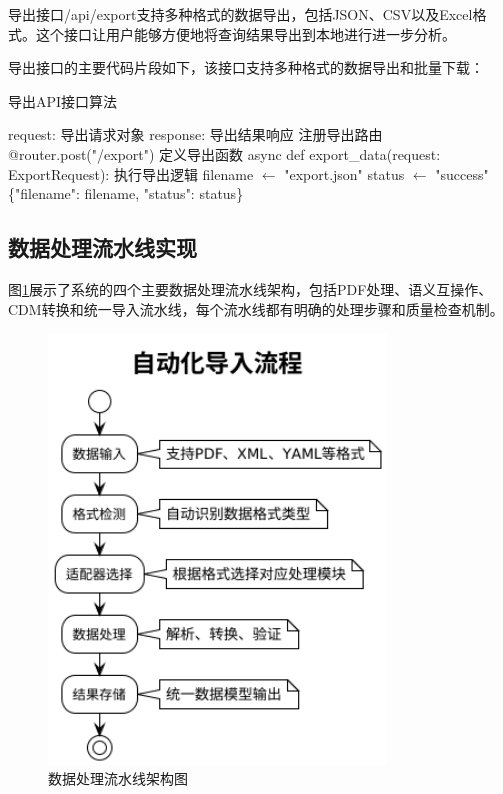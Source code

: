 导出接口/api/export支持多种格式的数据导出，包括JSON、CSV以及Excel格式。这个接口让用户能够方便地将查询结果导出到本地进行进一步分析。

导出接口的主要代码片段如下，该接口支持多种格式的数据导出和批量下载：

\begin{algorithm}[H]
\caption{导出API接口算法}
\begin{algorithmic}[1]
\REQUIRE request: 导出请求对象
\ENSURE response: 导出结果响应
\STATE 注册导出路由
\STATE @router.post("/export")
\STATE 定义导出函数
\STATE async def export\_data(request: ExportRequest):
\STATE     执行导出逻辑
\STATE     filename $\leftarrow$ "export.json"
\STATE     status $\leftarrow$ "success"
\STATE     \RETURN \{"filename": filename, "status": status\}
\end{algorithmic}
\end{algorithm}

\subsection{数据处理流水线实现}

图\ref{fig_data_processing_pipeline}展示了系统的四个主要数据处理流水线架构，包括PDF处理、语义互操作、CDM转换和统一导入流水线，每个流水线都有明确的处理步骤和质量检查机制。

\begin{figure}[H]
    \centering
    \includegraphics[width=0.8\textwidth,height=0.5\textheight,keepaspectratio]{chapters/fig-0/data_processing_pipeline.png}
    \caption{数据处理流水线架构图}
    \label{fig_data_processing_pipeline}
\end{figure}

